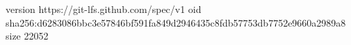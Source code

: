 version https://git-lfs.github.com/spec/v1
oid sha256:d6283086bbc3e57846bf591fa849d2946435c8fdb57753db7752e9660a2989a8
size 22052
